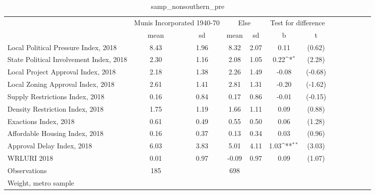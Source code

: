 \begin{table}[htbp]\centering
\def\sym#1{\ifmmode^{#1}\else\(^{#1}\)\fi}
\caption{samp\_nonsouthern\_pre \label{tab1}}
\begin{tabular}{l*{3}{cccc}}
\toprule
                    &\multicolumn{2}{c}{Munis Incorporated 1940-70}&\multicolumn{2}{c}{Else} &\multicolumn{2}{c}{Test for difference}\\
                    &        mean&          sd&        mean&          sd&           b         &           t\\
\midrule
Local Political Pressure Index, 2018&        8.43&        1.96&        8.32&        2.07&        0.11         &      (0.62)\\
State Political Involvement Index, 2018&        2.30&        1.16&        2.08&        1.05&        0.22\sym{*}  &      (2.28)\\
Local Project Approval Index, 2018&        2.18&        1.38&        2.26&        1.49&       -0.08         &     (-0.68)\\
Local Zoning Approval Index, 2018&        2.61&        1.41&        2.81&        1.31&       -0.20         &     (-1.62)\\
Supply Restrictions Index, 2018&        0.16&        0.84&        0.17&        0.86&       -0.01         &     (-0.15)\\
Density Restriction Index, 2018&        1.75&        1.19&        1.66&        1.11&        0.09         &      (0.88)\\
Exactions Index, 2018&        0.61&        0.49&        0.55&        0.50&        0.06         &      (1.28)\\
Affordable Housing Index, 2018&        0.16&        0.37&        0.13&        0.34&        0.03         &      (0.96)\\
Approval Delay Index, 2018&        6.03&        3.83&        5.01&        4.11&        1.03\sym{**} &      (3.03)\\
WRLURI 2018         &        0.01&        0.97&       -0.09&        0.97&        0.09         &      (1.07)\\
\midrule
Observations        &         185&            &         698&            &                     &            \\
\bottomrule
\multicolumn{7}{l}{\footnotesize Weight, metro sample}\\
\end{tabular}
\end{table}
